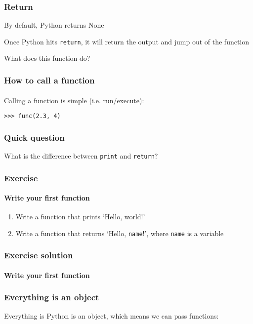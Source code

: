\begin{frame}\frametitle{Return}

    By default, Python returns None

    \vfill

    Once Python hits \texttt{return}, it will return the output and jump out of
    the function

    \pause


    What does this function do?

\end{frame}

\begin{frame}\frametitle{How to call a function}
    \framesubtitle{}

    Calling a function is simple (i.e. run/execute):

    \texttt{>>> func(2.3, 4)}

\end{frame}

\begin{frame}\frametitle{Quick question}

    What is the difference between \texttt{print} and \texttt{return}?

\end{frame}

\begin{frame}\frametitle{Exercise}
    \framesubtitle{Write your first function}

    \begin{enumerate}
         \item Write a function that prints `Hello, world!'
         \item Write a function that returns `Hello, \texttt{name}!', where \texttt{name}
         is a variable
     \end{enumerate}

\end{frame}

\begin{frame}\frametitle{Exercise solution}
    \framesubtitle{Write your first function}


\end{frame}

\begin{frame}\frametitle{Everything is an object}

    Everything is Python is an object, which means we can pass functions:

    \vfill


\end{frame}


